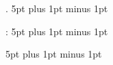 

    {\parskip}   %
    {\parskip}   %
    {\bfseries}  %
    {}       %
    {\bfseries\scshape} %
    {.}         %
    {5pt plus 1pt minus 1pt} %
    {}          %
  
    {\parskip}   %
    {\parskip}   %
    {}  %
    {}       %
    {} %
    {:}         %
    {5pt plus 1pt minus 1pt} %
    {}          %
  
    {\parskip}   %
    {\parskip}   %
    {}  %
    {}       %
    {\bfseries} %
    {}         %
    {5pt plus 1pt minus 1pt} %
    {}          %

\newenvironment{core}
    {\begin{adjustwidth}{0.8cm}{0.8cm}}
    {\end{adjustwidth}}
    
\newcommand{\thesisline}{%
    \noindent
    \begin{center}
        \vspace{0.3cm}
    --- $\bullet$ ---
    \end{center}
}